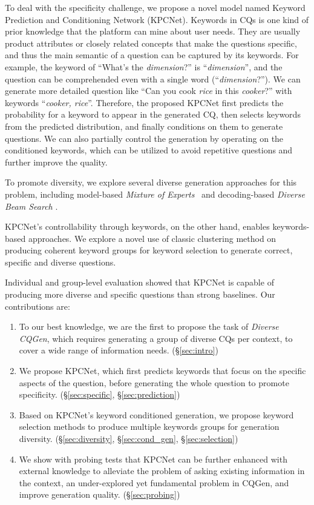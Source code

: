 To deal with the specificity challenge, we propose a novel model named 
Keyword Prediction and Conditioning Network (KPCNet). Keywords in CQs is one kind of prior knowledge that the platform can mine about user needs. They are usually
product attributes or closely related concepts that make the questions specific, and thus the main semantic of a question can be captured by its keywords. 
For example, the keyword of ``What's the \textit{dimension}?'' 
is ``\textit{dimension}'', and the question can be comprehended even with 
a single word (``\textit{dimension}?''). We can generate more detailed question like ``Can you cook \textit{rice} in this \textit{cooker}?'' with keywords ``\textit{cooker, rice}''. 
Therefore, the proposed KPCNet first predicts 
the probability for a keyword to appear in the generated CQ, 
then selects keywords from the predicted distribution, 
and finally conditions on them to generate questions. 
We can also partially control the generation by operating on the 
conditioned keywords, which can be utilized to avoid repetitive questions 
and further improve the quality.

To promote diversity, we explore several diverse generation approaches for 
this problem, including model-based 
\textit{Mixture of Experts}~\citep{shen2019mixture} and 
decoding-based \textit{Diverse Beam Search} \citep{vijayakumar2018diverse}. 

KPCNet's controllability through keywords, on the other hand, 
enables keywords-based approaches. We explore a novel use of classic
clustering method on producing coherent keyword groups for keyword selection 
to generate correct, specific and diverse questions.

Individual and group-level evaluation showed that KPCNet is capable of 
producing more diverse and specific questions than strong baselines. 
Our contributions are:

\begin{enumerate}
  \item To our best knowledge, we are the first to propose the 
task of \textit{Diverse CQGen}, which requires generating a group of 
diverse CQs per context, to cover a wide range of information needs.  
(\S \ref{sec:intro})
  \item We propose KPCNet, which first predicts keywords that focus on the specific aspects of the question, 
before generating the whole question to promote specificity. (\S \ref{sec:specific}, \S \ref{sec:prediction})

  \item Based on KPCNet's keyword conditioned generation, we propose keyword selection methods to produce multiple keywords groups for generation diversity. (\S \ref{sec:diversity}, \S \ref{sec:cond_gen}, \S \ref{sec:selection})
  \item We show with probing tests that KPCNet can be further enhanced with external knowledge to alleviate the problem of asking existing information in the context, an under-explored yet fundamental problem in CQGen, and improve generation quality. (\S \ref{sec:probing})
\end{enumerate}

